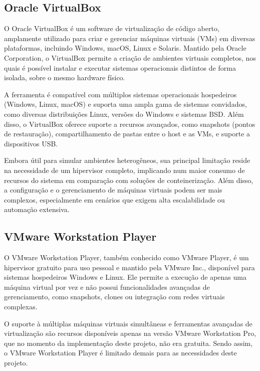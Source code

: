 \subsection{Oracle VirtualBox}
\label{subsection:VirtualBox}

O Oracle VirtualBox é um software de virtualização de código aberto, amplamente utilizado para criar e gerenciar máquinas virtuais (VMs) em diversas plataformas, incluindo Windows, macOS, Linux e Solaris. Mantido pela Oracle Corporation, o VirtualBox permite a criação de ambientes virtuais completos, nos quais é possível instalar e executar sistemas operacionais distintos de forma isolada, sobre o mesmo hardware físico.

A ferramenta é compatível com múltiplos sistemas operacionais hospedeiros (Windows, Linux, macOS) e suporta uma ampla gama de sistemas convidados, como diversas distribuições Linux, versões do Windows e sistemas BSD. Além disso, o VirtualBox oferece suporte a recursos avançados, como snapshots (pontos de restauração), compartilhamento de pastas entre o host e as VMs, e suporte a dispositivos USB.

Embora útil para simular ambientes heterogêneos, sua principal limitação reside na necessidade de um hipervisor completo, implicando num maior consumo de recursos do sistema em comparação com soluções de conteinerização. Além disso, a configuração e o gerenciamento de máquinas virtuais podem ser mais complexos, especialmente em cenários que exigem alta escalabilidade ou automação extensiva.

\subsection{VMware Workstation Player}
\label{subsection:VMware-Player}

O VMware Workstation Player, também conhecido como VMware Player, é um hipervisor gratuito para uso pessoal e mantido pela VMware Inc., disponível para sistemas hospedeiros Windows e Linux. Ele permite a execução de apenas uma máquina virtual por vez e não possui funcionalidades avançadas de gerenciamento, como snapshots, clones ou integração com redes virtuais complexas.

O suporte à múltiplas máquinas virtuais simultâneas e ferramentas avançadas de virtualização são recursos disponíveis apenas na versão VMware Workstation Pro, que no momento da implementação deste projeto, não era gratuita. Sendo assim, o VMware Workstation Player é limitado demais para as necessidades deste projeto.

